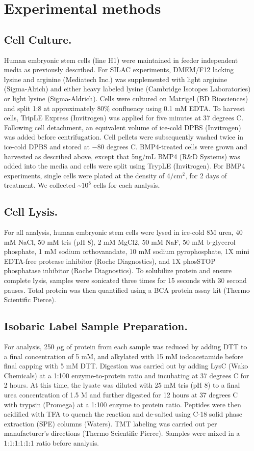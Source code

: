 \section{Experimental methods}

\subsection{Cell Culture.}
Human embryonic stem cells (line H1) were maintained in feeder independent media as previously described.\cite{feeder} For SILAC experiments, DMEM/F12 lacking lysine and arginine (Mediatech Inc.) was supplemented with light arginine (Sigma-Alrich) and either heavy labeled lysine (Cambridge Isotopes Laboratories) or light lysine (Sigma-Aldrich). Cells were cultured on Matrigel (BD Biosciences) and split 1:8 at approximately 80\% confluency using 0.1 mM EDTA. To harvest cells, TripLE Express (Invitrogen) was applied for five minutes at 37 degrees C. Following cell detachment, an equivalent volume of ice-cold DPBS (Invitrogen) was added before centrifugation. Cell pellets were subsequently washed twice in ice-cold DPBS and stored at $-80$ degrees C. BMP4-treated cells were grown and harvested as described above, except that 5ng/mL BMP4 (R\&D Systems) was added into the media and cells were split using TrypLE (Invitrogen). For BMP4 experiments, single cells were plated at the density of 4/cm$^2$, for 2 days of treatment. We collected \textasciitilde$10^8$ cells for each analysis.

\subsection{Cell Lysis.}
For all analysis, human embryonic stem cells were lysed in ice-cold 8M urea, 40 mM NaCl, 50 mM tris (pH 8), 2 mM MgCl2, 50 mM NaF, 50 mM b-glycerol phosphate, 1 mM sodium orthovanadate, 10 mM sodium pyrophosphate, 1X mini EDTA-free protease inhibitor (Roche Diagnostics), and 1X phosSTOP phosphatase inhibitor (Roche Diagnostics). To solubilize protein and ensure complete lysis, samples were sonicated three times for 15 seconds with 30 second pauses. Total protein was then quantified using a BCA protein assay kit (Thermo Scientific Pierce).

\subsection{Isobaric Label Sample Preparation.}
For analysis, 250 $\mu$g of protein from each sample was reduced by adding DTT to a final concentration of 5 mM, and alkylated with 15 mM iodoacetamide before final capping with 5 mM DTT. Digestion was carried out by adding LysC (Wako Chemicals) at a 1:100 enzyme-to-protein ratio and incubating at 37 degrees C for 2 hours. At this time, the lysate was diluted with 25 mM tris (pH 8) to a final urea concentration of 1.5 M and further digested for 12 hours at 37 degrees C with trypsin (Promega) at a 1:100 enzyme to protein ratio. Peptides were then acidified with TFA to quench the reaction and de-salted using C-18 solid phase extraction (SPE) columns (Waters). TMT labeling was carried out per manufacturer's directions (Thermo Scientific Pierce). Samples were mixed in a 1:1:1:1:1:1 ratio before analysis.

